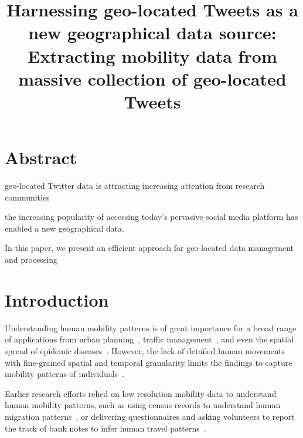 \documentclass[a4paper,11pt]{article}
\begin{document}

\title{ Harnessing  geo-located Tweets as a new geographical data source: Extracting mobility data from massive collection of geo-located Tweets}


\maketitle
\section*{Abstract}
geo-located Twitter data is attracting increasing attention from research communities

the increasing popularity of accessing today's pervasive social media platform has enabled a new geographical data.

In this paper, we present an efficient approach for geo-located data management and processing

\section{Introduction}
Understanding human mobility patterns is of great importance for a broad range of applications from urban planning~\cite{zheng2008}, traffic management~\cite{jiang2009}, and even the spatial spread of epidemic diseases~\cite{belik2011}.
However, the lack of detailed human movements with fine-grained spatial and temporal granularity limits the findings to capture mobility patterns of individuals~\cite{gonzalez2008,jurdak2015}.



Earlier research efforts relied on low resolution mobility data to understand human mobility patterns, such as using census records to understand human migration patterns~\cite{greenwood1985human}, or delivering questionnaires and asking volunteers to report the track of bank notes to infer human travel patterns~\cite{brockmann2006scaling}.
\end{document}
